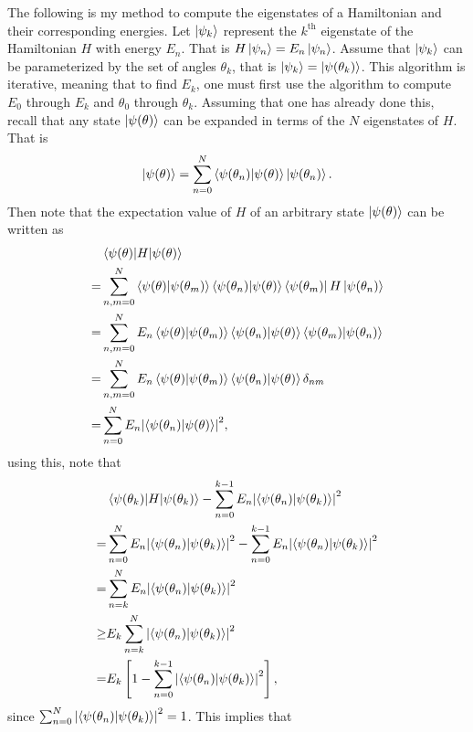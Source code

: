 \documentclass[10pt]{article}
\begin{document}
The following is my method to compute the eigenstates of a Hamiltonian and their corresponding energies. Let $\ket{\psi_k}$ represent the $k^{\text{th}}$ eigenstate of the Hamiltonian $H$ with energy $E_n$. That is
$H\ket{\psi_n}=E_n\ket{\psi_n}$.
Assume that $\ket{\psi_k}$ can be parameterized by the set of angles $\theta_k$, that is $\ket{\psi_k}=\ket{\psi(\theta_k)}$. This algorithm is iterative, meaning that to find $E_k$, one must first use the algorithm to compute $E_0$ through $E_k$ and $\theta_0$ through $\theta_k$. Assuming that one has already done this, recall that any state $\ket{\psi(\theta)}$ can be expanded in terms of the $N$ eigenstates of $H$. That is
\begin{align}
\ket{\psi(\theta)}=\sum_{n=0}^{N}\bra{\psi(\theta_n)}\ket{\psi(\theta)}\ket{\psi(\theta_n)}
.\end{align}
Then note that the expectation value of $H$ of an arbitrary state $\ket{\psi(\theta)}$ can be written as
\begin{align}
&\mel{\psi(\theta)}{H}{\psi(\theta)} \\
=&\sum_{n,m=0}^{N}\bra{\psi(\theta)}\ket{\psi(\theta_m)}\bra{\psi(\theta_n)}\ket{\psi(\theta)}\bra{\psi(\theta_m)}H\ket{\psi(\theta_n)} \\
=&\sum_{n,m=0}^{N}E_n\bra{\psi(\theta)}\ket{\psi(\theta_m)}\bra{\psi(\theta_n)}\ket{\psi(\theta)}\bra{\psi(\theta_m)}\ket{\psi(\theta_n)} \\
=&\sum_{n,m=0}^{N}E_n\bra{\psi(\theta)}\ket{\psi(\theta_m)}\bra{\psi(\theta_n)}\ket{\psi(\theta)}\delta_{nm} \\
=&\sum_{n=0}^{N}E_n\abs{\bra{\psi(\theta_n)}\ket{\psi(\theta)}}^2
,\end{align}
using this, note that
\begin{align}
&\mel{\psi(\theta_k)}{H}{\psi(\theta_k)}-\sum_{n=0}^{k-1}E_n\abs{\bra{\psi(\theta_n)}\ket{\psi(\theta_k)}}^2 \\
=&\sum_{n=0}^{N}E_n\abs{\bra{\psi(\theta_n)}\ket{\psi(\theta_k)}}^2-\sum_{n=0}^{k-1}E_n\abs{\bra{\psi(\theta_n)}\ket{\psi(\theta_k)}}^2 \\
=&\sum_{n=k}^{N}E_n\abs{\bra{\psi(\theta_n)}\ket{\psi(\theta_k)}}^2 \\
\geq& E_k\sum_{n=k}^{N}\abs{\bra{\psi(\theta_n)}\ket{\psi(\theta_k)}}^2 \\
=&E_k\left[1-\sum_{n=0}^{k-1}\abs{\bra{\psi(\theta_n)}\ket{\psi(\theta_k)}}^2\right]
,\end{align}
since $\sum_{n=0}^{N}\abs{\bra{\psi(\theta_n)}\ket{\psi(\theta_k)}}^2=1$. This implies that
\end{document}
